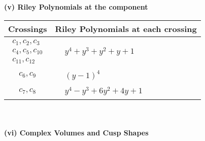 \documentclass[1p]{elsarticle_modified}
\theoremstyle{definition}
\begin{document}
\newpage\renewcommand{\arraystretch}{1}
\flushleft \textbf{(v) Riley Polynomials at the component}\newline \\
\begin{tabular}{m{50pt}|m{274pt}}
Crossings & \hspace{64pt}Riley Polynomials at each crossing \\
\hline $$\begin{aligned}c_{1},c_{2},c_{3}\\c_{4},c_{5},c_{10}\\c_{11},c_{12}\end{aligned}$$&$\begin{aligned}
&y^4+y^3+y^2+y+1
\end{aligned}$\\
\hline $$\begin{aligned}c_{6},c_{9}\end{aligned}$$&$\begin{aligned}
&(y-1)^4
\end{aligned}$\\
\hline $$\begin{aligned}c_{7},c_{8}\end{aligned}$$&$\begin{aligned}
&y^4- y^3+6 y^2+4 y+1
\end{aligned}$\\
\hline
\end{tabular}\\~\\
\newpage\flushleft \textbf{(vi) Complex Volumes and Cusp Shapes}
\end{document}
